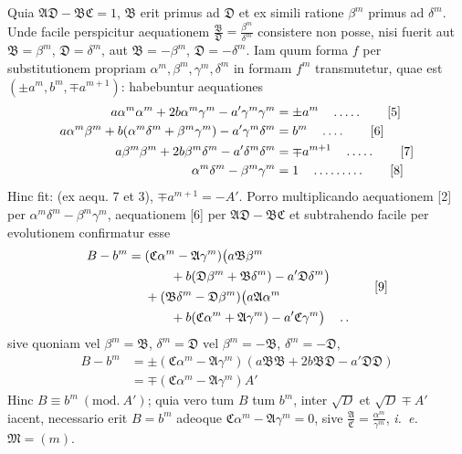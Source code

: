 Quia $\mathfrak{A}\mathfrak{D}-\mathfrak{B}\mathfrak{C}=1$, $\mathfrak{B}$ erit primus ad $\mathfrak{D}$ et ex simili ratione $\beta^m$ primus ad $\delta^m$. Unde facile perspicitur aequationem $\frac{\mathfrak{B}}{\mathfrak{D}}=\frac{\beta^m}{\delta^m}$ consistere non posse, nisi fuerit aut $\mathfrak{B}=\beta^m$, $\mathfrak{D}=\delta^m$, aut $\mathfrak{B}=-\beta^m$, $\mathfrak{D}=-\delta^m$. Iam quum forma $f$ per substitutionem propriam $\alpha^m,\beta^m,\gamma^m,\delta^m$ in formam $f^m$ transmutetur, quae est $(\pm a^m,b^m,\mp a^{m+1})$: habebuntur aequationes
\begin{align*}
a\alpha^m\alpha^m+2b\alpha^m\gamma^m-a'\gamma^m\gamma^m&=\pm a^m \quad \mathinner{\ldotp\ldotp\ldotp\ldotp\ldotp} \tag*{[5]}\\
a\alpha^m\beta^m+b(\alpha^m\delta^m+\beta^m\gamma^m)-a'\gamma^m\delta^m&=b^m \quad \mathinner{\ldotp\ldotp\ldotp\ldotp} \tag*{[6]}\\
a\beta^m\beta^m+2b\beta^m\delta^m-a'\delta^m\delta^m&=\mp a^{m+1} \quad \mathinner{\ldotp\ldotp\ldotp\ldotp\ldotp} \tag*{[7]}\\
\alpha^m\delta^m-\beta^m\gamma^m&=1 \quad \mathinner{\ldotp\ldotp\ldotp\ldotp\ldotp\ldotp\ldotp\ldotp\ldotp} \tag*{[8]}
\end{align*}
Hinc fit: (ex aequ. 7 et 3), $\mp a^{m+1}=-A'$. Porro multiplicando aequationem [2] per $\alpha^m\delta^m-\beta^m\gamma^m$, aequationem [6] per $\mathfrak{A}\mathfrak{D}-\mathfrak{B}\mathfrak{C}$ et subtrahendo facile per evolutionem confirmatur esse
\begin{equation*}
\begin{aligned}
B-b^m={}&(\mathfrak{C}\alpha^m-\mathfrak{A}\gamma^m)\bigl(a\mathfrak{B}\beta^m\\
&\qquad+b(\mathfrak{D}\beta^m+\mathfrak{B}\delta^m)-a'\mathfrak{D}\delta^m\bigr)\\
&+(\mathfrak{B}\delta^m-\mathfrak{D}\beta^m)\bigl(a\mathfrak{A}\alpha^m\\
&\qquad+b(\mathfrak{C}\alpha^m+\mathfrak{A}\gamma^m)-a'\mathfrak{C}\gamma^m\bigr)
\quad \mathinner{\ldotp\ldotp}
\end{aligned}
\tag*{[9]}
\end{equation*}
sive quoniam vel $\beta^m=\mathfrak{B}$, $\delta^m=\mathfrak{D}$ vel $\beta^m=-\mathfrak{B}$, $\delta^m=-\mathfrak{D}$,
\[
\begin{aligned}
B-b^m&=\pm(\mathfrak{C}\alpha^m-\mathfrak{A}\gamma^m)(a\mathfrak{B}\mathfrak{B}+2b\mathfrak{B}\mathfrak{D}-a'\mathfrak{D}\mathfrak{D})\\
&=\mp(\mathfrak{C}\alpha^m-\mathfrak{A}\gamma^m)A'
\end{aligned}
\]
Hinc $B\equiv b^m\ (\mathrm{mod.}\ A')$; quia vero tum $B$ tum $b^m$, inter $\surd D$ et $\surd D\mp A'$ iacent, necessario erit $B=b^m$ adeoque $\mathfrak{C}\alpha^m-\mathfrak{A}\gamma^m=0$, sive $\frac{\mathfrak{A}}{\mathfrak{C}}=\frac{\alpha^m}{\gamma^m}$, \textit{i. e.} $\mathfrak{M}=(m)$.

